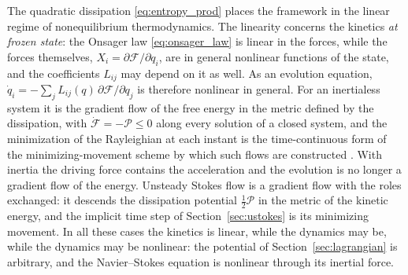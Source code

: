 \documentclass[12pt]{article}
\newif\ifhighlight \highlightfalse
\newif\ifhighlightfirst \highlightfirstfalse
\DeclareRobustCommand{\chg}[1]{\ifhighlight\ifhighlightfirst\textcolor{revised}{#1}\else#1\fi\else#1\fi}
\begin{document}
The quadratic dissipation \eqref{eq:entropy_prod} places the framework in the linear regime of nonequilibrium thermodynamics. The linearity concerns the kinetics \textit{at frozen state}: the Onsager law \eqref{eq:onsager_law} is linear in the forces, while the forces themselves, $X_i = \partial\mathcal{F}/\partial q_i$, are in general nonlinear functions of the state, and the coefficients $L_{ij}$ may depend on it as well. As an evolution equation, $\dot{q}_i = -\sum_j L_{ij}(q)\,\partial\mathcal{F}/\partial q_j$ is therefore nonlinear in general. For an inertialess system it is the gradient flow of the free energy in the metric defined by the dissipation, with $\dot{\mathcal{F}} = -\mathcal{P} \leq 0$ along every solution of a closed system, and the minimization of the Rayleighian at each instant is the time-continuous form of the minimizing-movement scheme by which such flows are constructed \cite{jordan1998, otto2001}. With inertia the driving force contains the acceleration and the evolution is no longer a gradient flow of the energy. Unsteady Stokes flow is a gradient flow with the roles exchanged: it descends the dissipation potential $\tfrac{1}{2}\mathcal{P}$ in the metric of the kinetic energy, and the implicit time step of Section~\ref{sec:ustokes} is its minimizing movement. In all these cases the kinetics is linear\chg{, while the dynamics may be} nonlinear: the potential of Section~\ref{sec:lagrangian} is arbitrary, and the Navier--Stokes equation is nonlinear through its inertial force.
\end{document}
